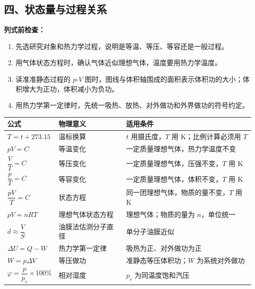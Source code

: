\begin{samepage}
\section*{四、状态量与过程关系}

\textbf{列式前检查：}
\nopagebreak[4]
\begin{enumerate}
  \item 先选研究对象和热力学过程，说明是等温、等压、等容还是一般过程。
  \item 用气体状态方程时，确认气体近似理想气体，温度要用热力学温度。
  \item 读准准静态过程的 $p$-$V$ 图时，图线与体积轴围成的面积表示体积功的大小；体积增大为正功，体积减小为负功。
  \item 用热力学第一定律时，先统一吸热、放热、对外做功和外界做功的符号约定。
\end{enumerate}
\end{samepage}

\begin{center}
\begingroup
\renewcommand{\arraystretch}{1.18}
\begin{tabular}{p{}p{}p{}}
\toprule
公式 & 物理意义 & 适用条件 \\
\midrule
$T=t+273.15$ & 温标换算 & $t$ 用摄氏度，$T$ 用 K；比例计算必须用 $T$ \\
$pV=C$ & 等温变化 & 一定质量理想气体，热力学温度不变 \\
$\dfrac{V}{T}=C$ & 等压变化 & 一定质量理想气体，压强不变，$T$ 用 K \\
$\dfrac{p}{T}=C$ & 等容变化 & 一定质量理想气体，体积不变，$T$ 用 K \\
$\dfrac{pV}{T}=C$ & 状态方程 & 同一团理想气体，物质的量不变，$T$ 用 K \\
$pV=nRT$ & 理想气体状态方程 & 理想气体；物质的量为 $n$，单位统一 \\
$d\approx\dfrac{V}{S}$ & 油膜法估测分子直径 & 单分子油膜近似 \\
$\Delta U=Q-W$ & 热力学第一定律 & 吸热为正、对外做功为正 \\
$W=p\Delta V$ & 等压做功 & 准静态等压体积功；$W$ 为系统对外做功 \\
$\varphi=\dfrac{p}{p_s}\times100\%$ & 相对湿度 & $p_s$ 为同温度饱和汽压 \\
\bottomrule
\end{tabular}
\endgroup
\end{center}

